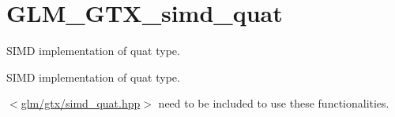 \hypertarget{group__gtx__simd__quat}{}\section{G\+L\+M\+\_\+\+G\+T\+X\+\_\+simd\+\_\+quat}
\label{group__gtx__simd__quat}


S\+I\+M\+D implementation of quat type.  


S\+I\+M\+D implementation of quat type. 

$<$\hyperlink{simd__quat_8hpp}{glm/gtx/simd\+\_\+quat.\+hpp}$>$ need to be included to use these functionalities. 